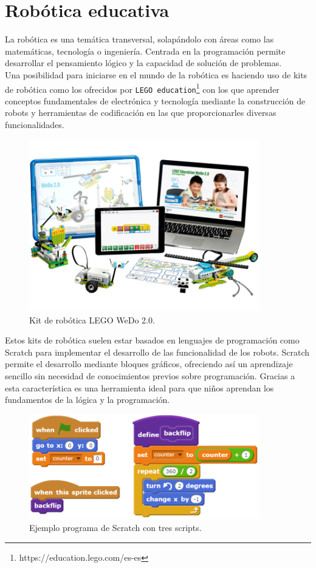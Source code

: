 \documentclass[a4paper, 12pt]{book}
\begin{document}
	\section{Robótica educativa}
	\label{sec:1_robotica_edicativa}
		La robótica es una temática transversal, solapándolo con áreas como las matemáticas, tecnología o ingeniería. Centrada en la programación permite desarrollar el pensamiento lógico y la capacidad de solución de problemas. \\
		
		Una posibilidad para iniciarse en el mundo de la robótica es haciendo uso de kits de robótica como los ofrecidos por \texttt{LEGO education}\footnote{https://education.lego.com/es-es} con los que aprender conceptos fundamentales de electrónica y tecnología mediante la construcción de robots y herramientas de codificación en las que proporcionarles diversas funcionalidades. \\
		
		\begin{figure}[H]
			\centering
			\includegraphics[width=10cm, keepaspectratio]{img/lego.png}
			\caption{Kit de robótica LEGO WeDo 2.0.}
			\label{fig:lego}
		\end{figure}
		
		Estos kits de robótica suelen estar basados en lenguajes de programación como Scratch para implementar el desarrollo de las funcionalidad de los robots. Scratch permite el desarrollo mediante bloques gráficos, ofreciendo así un aprendizaje sencillo sin necesidad de conocimientos previos sobre programación. Gracias a esta característica es una herramienta ideal para que niños aprendan los fundamentos de la lógica y la programación.
		
		\begin{figure}[H]
			\centering
			\includegraphics[width=10cm, keepaspectratio]{img/scratch.png}
			\caption{Ejemplo programa de Scratch con tres scripts.}
			\label{fig:scratch}
		\end{figure}
		
\end{document}
